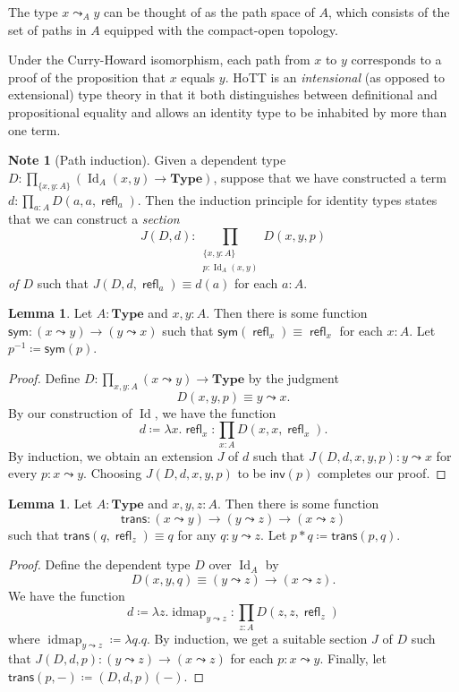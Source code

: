 \documentclass[10pt,letterpaper,cm]{nupset}
\theoremstyle{definition}
\newtheorem{note}[definition]{Note}
\theoremstyle{theorem}
\newtheorem{lemma}[definition]{Lemma}
\theoremstyle{remark}
\newcommand{\1}{\mathbf{1}}
\newcommand{\0}{\vec 0}
\DeclareMathOperator{\id}{Id}
\DeclareMathOperator{\idmap}{idmap}
\DeclareMathOperator{\refl}{\mathsf{refl}}
\begin{document}
\smallskip

The type $x \leadsto_A y$ can be thought of as the path space of $A$, which consists of the set of paths in $A$ equipped with the compact-open topology. 


\medskip

Under the Curry-Howard isomorphism, each path from $x$ to $y$ corresponds to a proof of the proposition that $x$ equals $y$. HoTT is an \emph{intensional} (as opposed to extensional) type theory in that it both distinguishes between definitional and propositional equality and allows an identity type to be inhabited by more than one term.

\medskip

\begin{note}[Path induction]
Given a dependent type $D: \prod_{\{x,y:A\}}\left(\id_A(x,y) \to \mathbf{Type}\right)$, suppose that we have constructed a term $d: \prod_{a:A} D(a,a, \refl_a)$. Then the induction principle for identity types states that we can construct a \textit{section}  $$J(D, d)  :  \prod_{\substack{\{x,y:A\} \\ p: \id_A(x,y)}} D(x,y,p) $$  \textit{of $D$} such that $J(D, d, \refl_a) \equiv d(a)$ for each $a: A$.
\end{note}

\begin{lemma}
Let $A: \mathbf{Type}$ and $x,y: A$. Then there is some function $\mathsf{sym}:(x\leadsto y) \to (y \leadsto x)$ such that $\mathsf{sym} (\refl_x) \equiv \refl_x$ for each $x:A$. Let $p^{{-}1} \coloneqq \mathsf{sym}(p)$.
\end{lemma}
\begin{proof}
Define $D: \prod_{x,y:A}(x\leadsto y) \to \mathbf{Type}$ by the judgment $$D(x,y,p) \equiv y \leadsto x .$$ By our construction of $\id$, we have the function $$d\coloneqq \lambda x. \refl_x : \prod_{x:A}D(x,x,\refl_x).$$ By induction, we obtain an extension $J$ of $d$ such that $J(D, d, x, y, p) : y \leadsto x$ for every $p: x \leadsto y$. Choosing $J(D, d,x,y,p)$ to be $\mathsf{inv}(p) $ completes our proof.
\end{proof}

\begin{lemma}
Let $A: \mathbf{Type}$ and $x,y,z: A$. Then there is some function $$\mathsf{trans} : (x\leadsto y) \to (y \leadsto z) \to (x \leadsto z)$$ such that $\mathsf{trans}(q, \refl_z) \equiv q$ for any $q: y \leadsto z$. Let $p \ast q \coloneqq \mathsf{trans}(p,q)$.
\end{lemma}
\begin{proof}
Define the dependent type $D$ over $\id_A$ by $$D(x, y, q) \equiv (y \leadsto z) \to (x \leadsto z).$$ We have the function $$d \coloneqq\lambda z.\idmap_{y\leadsto z} : \prod_{z: A} D(z, z, \refl_z)$$ where $\idmap_{y\leadsto z} \coloneqq \lambda q.q$. By induction, we get a suitable section $J$ of $D$ such that $J(D, d, p) : (y \leadsto z) \to (x\leadsto z)$ for each $p: x\leadsto y$.  Finally, let $\mathsf{trans}(p, -) \coloneqq (D, d, p)(-)$.
\end{proof}
\end{document}
